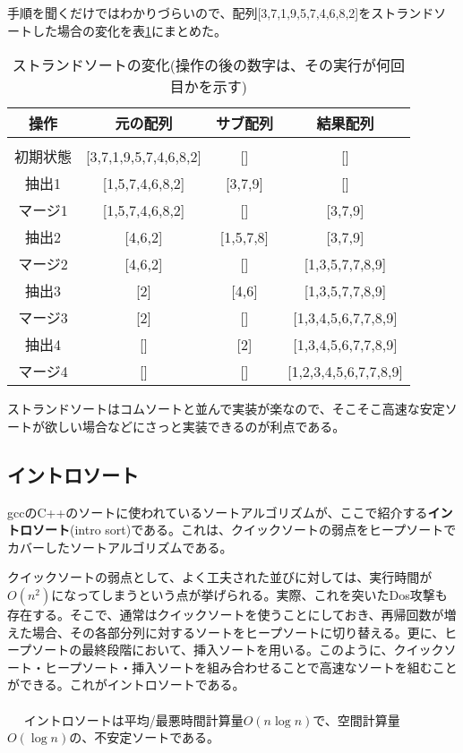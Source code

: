 手順を聞くだけではわかりづらいので、配列[3,7,1,9,5,7,4,6,8,2]をストランドソートした場合の変化を表\ref{strand}にまとめた。
\begin{table}[htb]
\centering
\caption{ストランドソートの変化(操作の後の数字は、その実行が何回目かを示す)}\label{strand}
\begin{tabular}{|c||c|c|c|}\hline
操作&元の配列&サブ配列&結果配列\\ \hline
&&& \\[-15pt] \hline
初期状態&[3,7,1,9,5,7,4,6,8,2]&[]&[] \\ \hline
抽出1&[1,5,7,4,6,8,2]&[3,7,9]&[] \\ \hline
マージ1&[1,5,7,4,6,8,2]&[]&[3,7,9] \\ \hline
抽出2&[4,6,2]&[1,5,7,8]&[3,7,9] \\ \hline
マージ2&[4,6,2]&[]&[1,3,5,7,7,8,9] \\ \hline
抽出3&[2]&[4,6]&[1,3,5,7,7,8,9] \\ \hline
マージ3&[2]&[]&[1,3,4,5,6,7,7,8,9] \\ \hline
抽出4&[]&[2]&[1,3,4,5,6,7,7,8,9] \\ \hline
マージ4&[]&[]&[1,2,3,4,5,6,7,7,8,9] \\ \hline
\end{tabular}
\end{table}

ストランドソートはコムソートと並んで実装が楽なので、そこそこ高速な安定ソートが欲しい場合などにさっと実装できるのが利点である。

\subsection{イントロソート}
gccのC++のソートに使われているソートアルゴリズムが、ここで紹介する\textbf{イントロソート}(intro sort)である。これは、クイックソートの弱点をヒープソートでカバーしたソートアルゴリズムである。

クイックソートの弱点として、よく工夫された並びに対しては、実行時間が$O(n^2)$になってしまうという点が挙げられる。実際、これを突いたDos攻撃も存在する。そこで、通常はクイックソートを使うことにしておき、再帰回数が増えた場合、その各部分列に対するソートをヒープソートに切り替える。更に、ヒープソートの最終段階において、挿入ソートを用いる。このように、クイックソート・ヒープソート・挿入ソートを組み合わせることで高速なソートを組むことができる。これがイントロソートである。
\\ \\　
イントロソートは平均/最悪時間計算量$O(n\log n)$で、空間計算量$O(\log n)$の、不安定ソートである。

